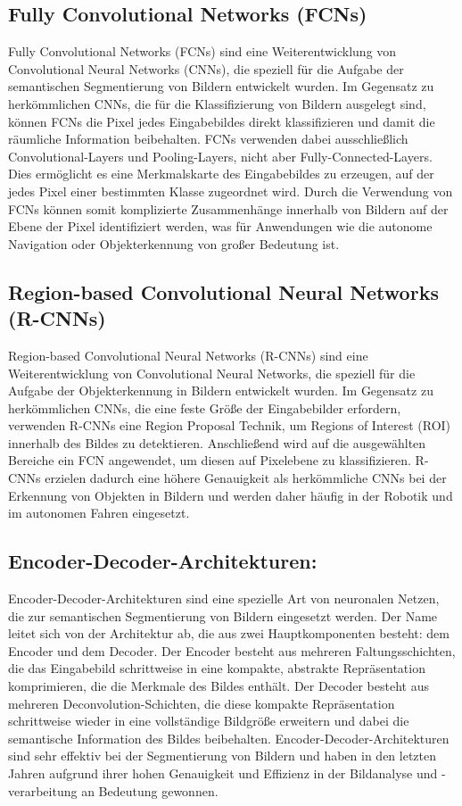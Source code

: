 \subsection{Fully Convolutional Networks (FCNs)}
Fully Convolutional Networks (FCNs) sind eine Weiterentwicklung von
Convolutional Neural Networks (CNNs), die speziell für die Aufgabe der
semantischen Segmentierung von Bildern entwickelt wurden. Im Gegensatz zu
herkömmlichen CNNs, die für die Klassifizierung von Bildern ausgelegt sind,
können FCNs die Pixel jedes Eingabebildes direkt klassifizieren und damit die
räumliche Information beibehalten. FCNs verwenden dabei ausschließlich
Convolutional-Layers und Pooling-Layers, nicht aber Fully-Connected-Layers.
Dies ermöglicht es eine Merkmalskarte des Eingabebildes zu erzeugen, auf der
jedes Pixel einer bestimmten Klasse zugeordnet wird. Durch die Verwendung von
FCNs können somit komplizierte Zusammenhänge innerhalb von Bildern auf der
Ebene der Pixel identifiziert werden, was für Anwendungen wie die autonome
Navigation oder Objekterkennung von großer Bedeutung ist. \cite{7298965}

\subsection{Region-based Convolutional Neural Networks (R-CNNs)}
Region-based Convolutional Neural Networks (R-CNNs) sind eine Weiterentwicklung
von Convolutional Neural Networks, die speziell für die Aufgabe der
Objekterkennung in Bildern entwickelt wurden. Im Gegensatz zu herkömmlichen
CNNs, die eine feste Größe der Eingabebilder erfordern, verwenden R-CNNs eine
Region Proposal Technik, um Regions of Interest (ROI) innerhalb des Bildes zu
detektieren. Anschließend wird auf die ausgewählten Bereiche ein FCN
angewendet, um diesen auf Pixelebene zu klassifizieren. R-CNNs erzielen dadurch
eine höhere Genauigkeit als herkömmliche CNNs bei der Erkennung von Objekten in
Bildern und werden daher häufig in der Robotik und im autonomen Fahren
eingesetzt. \cite{8237584}

\subsection{Encoder-Decoder-Architekturen:}
Encoder-Decoder-Architekturen sind eine spezielle Art von neuronalen Netzen,
die zur semantischen Segmentierung von Bildern eingesetzt werden. Der Name
leitet sich von der Architektur ab, die aus zwei Hauptkomponenten besteht: dem
Encoder und dem Decoder. Der Encoder besteht aus mehreren Faltungsschichten,
die das Eingabebild schrittweise in eine kompakte, abstrakte Repräsentation
komprimieren, die die Merkmale des Bildes enthält. Der Decoder besteht aus
mehreren Deconvolution-Schichten, die diese kompakte Repräsentation
schrittweise wieder in eine vollständige Bildgröße erweitern und dabei die
semantische Information des Bildes beibehalten. Encoder-Decoder-Architekturen
sind sehr effektiv bei der Segmentierung von Bildern und haben in den letzten
Jahren aufgrund ihrer hohen Genauigkeit und Effizienz in der Bildanalyse und
-verarbeitung an Bedeutung gewonnen.
